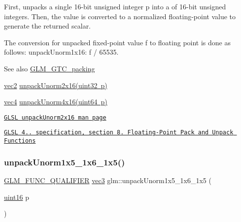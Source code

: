 First, unpacks a single 16-\/bit unsigned integer p into a of 16-\/bit unsigned integers. Then, the value is converted to a normalized floating-\/point value to generate the returned scalar.

The conversion for unpacked fixed-\/point value f to floating point is done as follows\+: unpack\+Unorm1x16\+: f / 65535.

\begin{DoxySeeAlso}{See also}
\mbox{\hyperlink{group__gtc__packing}{G\+L\+M\+\_\+\+G\+T\+C\+\_\+packing}} 

\mbox{\hyperlink{group__core__types_gaa1618f51db67eaa145db101d8c8431d8}{vec2}} \mbox{\hyperlink{group__core__func__packing_ga1f66188e5d65afeb9ffba1ad971e4007}{unpack\+Unorm2x16(uint32 p)}} 

\mbox{\hyperlink{group__core__types_ga5881b1b022d7fd1b7218f5916532dd02}{vec4}} \mbox{\hyperlink{group__gtc__packing_gafb2b502bc406031a5618ce930139a9e3}{unpack\+Unorm4x16(uint64 p)}} 

\href{http://www.opengl.org/sdk/docs/manglsl/xhtml/unpackUnorm2x16.xml}{\tt G\+L\+SL unpack\+Unorm2x16 man page} 

\href{http://www.opengl.org/registry/doc/GLSLangSpec.4.20.8.pdf}{\tt G\+L\+SL 4.. specification, section 8. Floating-\/\+Point Pack and Unpack Functions} 
\end{DoxySeeAlso}
\mbox{\label{group__gtc__packing_ga6804d0525daf68bcac226f46fbb3b24e}} 
\subsubsection{\texorpdfstring{unpack\+Unorm1x5\+\_\+1x6\+\_\+1x5()}{unpackUnorm1x5\_1x6\_1x5()}}
{\footnotesize\ttfamily \mbox{\hyperlink{setup_8hpp_a33fdea6f91c5f834105f7415e2a64407}{G\+L\+M\+\_\+\+F\+U\+N\+C\+\_\+\+Q\+U\+A\+L\+I\+F\+I\+ER}} \mbox{\hyperlink{group__core__types_ga1c47e8b3386109bc992b6c48e91b0be7}{vec3}} glm\+::unpack\+Unorm1x5\+\_\+1x6\+\_\+1x5 (\begin{DoxyParamCaption}\item[{\mbox{\hyperlink{group__gtc__type__precision_gad8c2939e1fdd8e5828b31d95c52255d5}{uint16}}}]{p }\end{DoxyParamCaption})}

